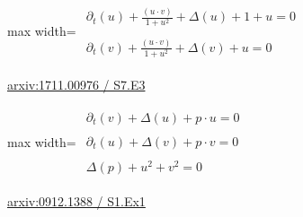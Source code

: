 \documentclass[10pt,a4paper]{article}
\begin{document}
\begin{minipage}{\linewidth}
\begin{center}\begin{adjustbox}{max width=\linewidth}$\displaystyle\begin{gathered}\begin{gathered}\partial_{t}(u)+\frac{(u\cdot v)}{1+u^{2}}+\Delta(u)+1+u=0\end{gathered}\\[5pt]\begin{gathered}\partial_{t}(v)+\frac{(u\cdot v)}{1+u^{2}}+\Delta(v)+u=0\end{gathered}\end{gathered}$\end{adjustbox}\end{center}
{\small \href{https://arxiv.org/html/1711.00976#S7.E3}{arxiv:1711.00976 / S7.E3}}\par
\end{minipage}\par\vspace{7mm}

\begin{minipage}{\linewidth}
\begin{center}\begin{adjustbox}{max width=\linewidth}$\displaystyle\begin{gathered}\begin{gathered}\partial_{t}(v)+\Delta(u)+p\cdot u=0\end{gathered}\\[5pt]\begin{gathered}\partial_{t}(u)+\Delta(v)+p\cdot v=0\end{gathered}\\[5pt]\begin{gathered}\Delta(p)+u^{2}+v^{2}=0\end{gathered}\end{gathered}$\end{adjustbox}\end{center}
{\small \href{https://arxiv.org/html/0912.1388#S1.Ex1}{arxiv:0912.1388 / S1.Ex1}}\par
\end{minipage}\par\vspace{7mm}
\end{document}
